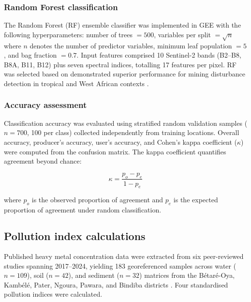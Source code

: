 \documentclass[preprint,12pt,authoryear]{elsarticle}
\begin{document}
\subsubsection{Random Forest classification}

The Random Forest (RF) ensemble classifier was implemented in GEE with the following hyperparameters: number of trees $= 500$, variables per split $= \sqrt{n}$ where $n$ denotes the number of predictor variables, minimum leaf population $= 5$, and bag fraction $= 0.7$. Input features comprised 10 Sentinel-2 bands (B2--B8, B8A, B11, B12) plus seven spectral indices, totalling 17 features per pixel. RF was selected based on demonstrated superior performance for mining disturbance detection in tropical and West African contexts \citep{Ngom2020, Duan2022}.

\subsubsection{Accuracy assessment}

Classification accuracy was evaluated using stratified random validation samples ($n = 700$, 100 per class) collected independently from training locations. Overall accuracy, producer's accuracy, user's accuracy, and Cohen's kappa coefficient ($\kappa$) were computed from the confusion matrix. The kappa coefficient quantifies agreement beyond chance:

\begin{equation}
\kappa = \frac{p_o - p_e}{1 - p_e}
\label{eq:kappa}
\end{equation}

\noindent where $p_o$ is the observed proportion of agreement and $p_e$ is the expected proportion of agreement under random classification.


\subsection{Pollution index calculations}

Published heavy metal concentration data were extracted from six peer-reviewed studies spanning 2017--2024, yielding 183 georeferenced samples across water ($n = 109$), soil ($n = 42$), and sediment ($n = 32$) matrices from the B\'{e}tar\'{e}-Oya, Kamb\'{e}l\'{e}, Pater, Ngoura, Pawara, and Bindiba districts \citep{Rakotondrabe2017, Rakotondrabe2018, NgoaManga2024, Fonshiynwa2024, Dallou2018, Fodoue2022, Edjengte2023}. Four standardised pollution indices were calculated.
\end{document}
